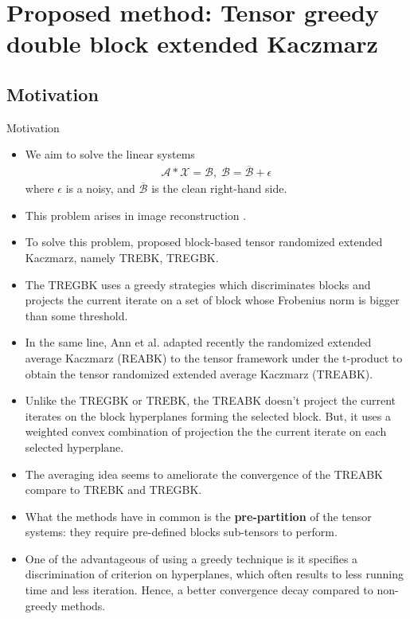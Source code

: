 \documentclass[aspectratio=169]{beamer}
\def\fm#1{\mathcal{#1}}
\def\fm#1{\mathcal{#1}}
\begin{document}
\section{Proposed method: Tensor greedy double  block extended Kaczmarz}
\subsection{Motivation}
\begin{frame}{Motivation}
\begin{itemize}
    \item We aim to solve the linear systems 
    \begin{align}
        \label{eq:eq-1}
            \fm A * \fm X =  \fm B, \; \fm B = \overline{\fm B} + \epsilon
\end{align}
where $\epsilon$ is a noisy, and $\overline{\fm B}$ is the clean right-hand side. 
\item This problem arises in image reconstruction \cite{kilmer2013third, an2025randomized}.
\item To solve this problem, \cite{huang2024tensor} proposed block-based tensor randomized extended  Kaczmarz, namely TREBK, TREGBK.
\item The TREGBK uses a greedy strategies which discriminates blocks  and  projects the current iterate  on a set of block whose Frobenius norm is bigger than some threshold.
\end{itemize}
\end{frame}
\begin{frame}{}
\begin{itemize}
    \item In the same line,  Ann et al. \cite{an2025randomized} adapted recently the randomized extended average Kaczmarz (REABK) \cite{du2020randomized} to the tensor framework under the t-product to obtain the tensor randomized extended average Kaczmarz (TREABK).
    \item Unlike the TREGBK or TREBK, the TREABK doesn't project the current iterates on the block hyperplanes forming the selected block. But, it uses a weighted convex combination of projection the the current iterate on each selected hyperplane. 
\end{itemize}
\end{frame}
\begin{frame}{}
\begin{itemize}
    \item The averaging idea seems to ameliorate the convergence of the TREABK compare to TREBK and TREGBK.
    \item What the methods have in common is the \textbf{pre-partition} of the tensor systems:  they require  pre-defined blocks sub-tensors to perform.
    \item One of the advantageous of using a greedy technique is it specifies a discrimination of criterion on hyperplanes, which often results to less running time and less iteration. Hence, a better convergence decay \cite{bai2018greedy, bai2021greedy} compared to non-greedy methods.
\end{itemize}
\end{frame}
\end{document}
